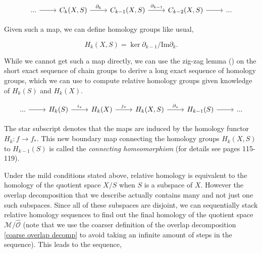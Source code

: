 \documentclass[10pt]{article} %
\theoremstyle{plain}
\theoremstyle{definition}
\theoremstyle{remark}
\begin{document}
\begin{equation*}
    \begin{tikzcd}
        ... \arrow[r, ""] & C_k(X,S) \arrow[r, "\partial_k"] & C_{k-1}(X,S) \arrow[r,"\partial_{k-1}"] & C_{k-2}(X,S) \arrow[r,""] & ...
    \end{tikzcd}
\end{equation*}

Given such a map, we can define homology groups like usual,

\begin{equation*}
    H_k(X,S) = \ker\partial_{k-1} / \text{Im}{\partial_k}.
\end{equation*}

While we cannot get such a map directly, we can use the zig-zag lemma (\cite{munkres2018elements}) on the short exact sequence of chain groups to derive a long exact sequence of homology groups, which we can use to compute relative homology groups given knowledge of $H_k(S)$ and $H_k(X)$.

\begin{equation*}
    \begin{tikzcd}
        ... \arrow[r, ""] & H_k(S) \arrow[r, "i_*"] & H_k(X) \arrow[r,"j_*"] & H_k(X,S) \arrow[r,"\partial_*"] & H_{k-1}(S) \arrow[r,""] & ...
    \end{tikzcd}
\end{equation*}

The star subscript denotes that the maps are induced by the homology functor $H_k: f \to f_*$. This new boundary map connecting the homology groups $H_k(X,S)$ to $H_{k-1}(S)$ is called the \textit{connecting homeomorphism} (for details see \citet{hatcher2005algebraic} pages 115-119). 

Under the mild conditions stated above, relative homology is equivalent to the homology of the quotient space $X/S$ when $S$ is a subspace of $X$. However the overlap decomposition that we describe actually contains many and not just one such subspaces. Since all of these subspaces are disjoint, we can sequentially stack relative homology sequences to find out the final homology of the quotient space $\mathcal{M}/\hat{\mathcal{O}}$ (note that we use the coarser definition of the overlap decomposition \ref{coarse overlap decomp} to avoid taking an infinite amount of steps in the sequence). This leads to the sequence,
\end{document}
